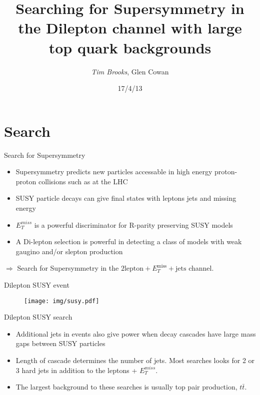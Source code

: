 \documentclass{beamer}
\title[Searching for Dilepton SUSY with $t\bar{t}$ backgrounds\hspace{2.5em}\insertframenumber/18]{Searching for Supersymmetry in the Dilepton channel with large top quark backgrounds} %
\author{\emph{Tim Brooks}, Glen Cowan}
\institute{Royal Holloway University of London}
\date{17/4/13}
\begin{document}
\begin{frame}
\titlepage
\end{frame}

\section{Search}
\begin{frame}{Search for Supersymmetry}
  \begin{itemize}
    \item Supersymmetry predicts new particles accessable in high energy proton-proton collisions such as at the LHC
    \item SUSY particle decays can give final states with leptons jets and missing energy
    \item $E_{T}^{miss}$ is a powerful discriminator for R-parity preserving SUSY models
    \item A Di-lepton selection is powerful in detecting a class of models with weak gaugino and/or slepton production
  \end{itemize}
$\Rightarrow$ Search for Supersymmetry in the $2 \text{lepton} + E_{T}^{\text{miss}} + \text{jets}$ channel.
\end{frame}

\begin{frame}{Dilepton SUSY event}
  \begin{figure}
    \centering
    \texttt{[image: img/susy.pdf]}
  \end{figure}
\end{frame}

\begin{frame}{Dilepton SUSY search}
\begin{itemize}
    \item Additional jets in events also give power when decay cascades have large mass gaps between SUSY particles

    \item Length of cascade determines the number of jets. Most searches looks for 2 or 3 hard jets in addition to the leptons + $E_{T}^{miss}$.

    \item The largest background to these searches is usually top pair production, $t\bar{t}$.
\end{itemize}
\end{frame}
\end{document}
